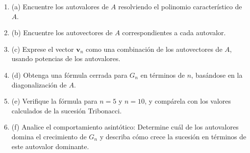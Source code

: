 \documentclass{article}
\begin{document}
\begin{enumerate}
    \item (a) Encuentre los autovalores de \( A \) resolviendo el polinomio característico de \( A \).
    \item (b) Encuentre los autovectores de \( A \) correspondientes a cada autovalor.
    \item (c) Exprese el vector \( \mathbf{v}_n \) como una combinación de los autovectores de \( A \), usando potencias de los autovalores.
    \item (d) Obtenga una fórmula cerrada para \( G_n \) en términos de \( n \), basándose en la diagonalización de \( A \).
    \item (e) Verifique la fórmula para \( n = 5 \) y \( n = 10 \), y compárela con los valores calculados de la sucesión Tribonacci.
    \item (f) Analice el comportamiento asintótico: Determine cuál de los autovalores domina el crecimiento de \( G_n \) y describa cómo crece la sucesión en términos de este autovalor dominante.
\end{enumerate}
\end{document}
